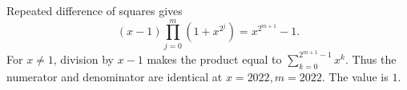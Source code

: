 Repeated difference of squares gives
\[
(x-1)\prod_{j=0}^{m}(1+x^{2^j})=x^{2^{m+1}}-1.
\]
For $x\ne1$, division by $x-1$ makes the product equal to $\sum_{k=0}^{2^{m+1}-1}x^k$. Thus the numerator and denominator are identical at $x=2022,m=2022$. The value is $\boxed1$.
